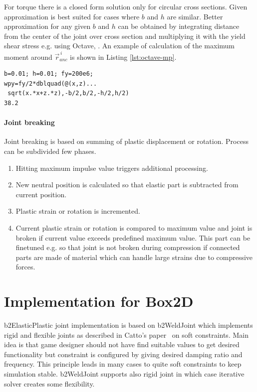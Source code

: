 \documentclass{jcgt}
\begin{document}
For torque there is a closed form solution only for
circular cross sections.
Given approximation is 
best suited for cases where $b$ and $h$ are similar.
Better approximation for any given $b$ and $h$ can be obtained 
by integrating distance from the center of the joint over cross section and
multiplying it with the yield shear stress e.g. using Octave, \cite{octave}.
An example of calculation of the maximum moment  around $\vec{r}_{anc}^{\,i} $
is shown in Listing \ref{lst:octave-mp}.

\lstset{language=octave}
\begin{lstlisting}[caption={Calculation of maximum moment  around $\vec{r}_{anc}^{\,i} $ using Octave.}, 
label={lst:octave-mp}, float]
b=0.01; h=0.01; fy=200e6;
wpy=fy/2*dblquad(@(x,z)...
 sqrt(x.*x+z.*z),-b/2,b/2,-h/2,h/2)
38.2
\end{lstlisting}


\paragraph{Joint breaking}
Joint breaking is based on summing of plastic displacement or rotation.
Process can be subdivided few phases.

\begin{enumerate}
\item Hitting maximum impulse value triggers additional processing.
\item New neutral position is calculated so that elastic part is subtracted from current position.
\item Plastic strain or rotation is incremented.
\item Current plastic strain or rotation is compared to maximum value and joint is broken if 
current value exceeds predefined maximum value. This part can be finetuned e.g. so that joint is 
not broken during compression if connected parts are made of material which can handle large
strains due to compressive forces. 
\end{enumerate}

\section{Implementation for Box2D}
b2ElasticPlastic joint implementation is based on b2WeldJoint which implements rigid and flexible joints as
described in Catto's paper~ on soft constraints. Main idea is that game designer should not have
find suitable values to get desired functionality but constraint is configured by giving desired  damping ratio and frequency.
This principle leads in many cases to quite soft constraints to keep simulation stable. 
b2WeldJoint supports also rigid joint in which case iterative solver creates some flexibility.
\end{document}

